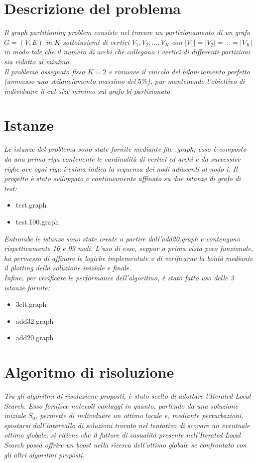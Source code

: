 \documentclass[12pt,titlepage,oneside]{article}
\begin{document}
\clearpage
\tableofcontents

\clearpage
\section{Descrizione del problema}
\textit{Il graph partitioning problem consiste nel trovare un partizionamento di un grafo $G = (V, E)$ in $K$ sottoinsiemi di vertici $V_1, V_2, \ldots, V_K$ con $|V_1| = |V_2| = \ldots = |V_K|$ in modo tale che il numero di archi che collegano i vertici di differenti partizioni sia ridotto al minimo.\\
Il problema assegnato fissa $K=2$ e rimuove il vincolo del bilanciamento perfetto (ammesso uno sbilanciamento massimo del $5\%$), pur mantenendo l'obiettivo di individuare il cut-size minimo sul grafo bi-partizionato}

\section{Istanze}
\textit{Le istanze del problema sono state fornite mediante file .graph; esso è composto da una prima riga contenente le cardinalità di vertici ed archi e da successive righe ove ogni riga i-esima indica la sequenza dei nodi adiacenti al nodo i.
Il progetto è stato sviluppato e continuamente affinato su due istanze di grafo di test:}
\begin{itemize}
  \item test.graph
  \item test.100.graph
\end{itemize}
\textit{Entrambe le istanze sono state create a partire dall'add20.graph e contengono rispettivamente 16 e 99 nodi. L'uso di esse, seppur a prima vista poco funzionale, ha permesso di affinare le logiche implementate e di verificarne la bontà mediante il plotting della soluzione iniziale e finale.\\
Infine, per verificare le performance dell'algoritmo, è stato fatto uso delle 3 istanze fornite:}
\begin{itemize}
  \item 3elt.graph
  \item add32.graph
  \item add20.graph
\end{itemize}

\section{Algoritmo di risoluzione}
\textit{Tra gli algoritmi di risoluzione proposti, è stato scelto di adottare l'Iterated Local Search. Esso fornisce notevoli vantaggi in quanto, partendo da una soluzione iniziale $S_0$, permette di individuare un ottimo locale e, mediante perturbazioni, spostarsi dall'intervallo di soluzioni trovato nel tentativo di scovare un eventuale ottimo globale; si ritiene che il fattore di casualità presente nell'Iterated Local Search possa offrire un boost nella ricerca dell'ottimo globale se confrontato con gli altri algoritmi proposti.}
\end{document}
